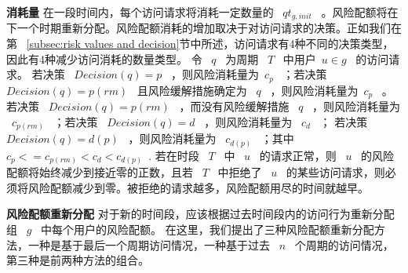 \textbf{消耗量} 在一段时间内，每个访问请求将消耗一定数量的 ~$qt_{g,init}$~ 。风险配额将在下一个时期重新分配。风险配额消耗的增加取决于对访问请求的决策。正如我们在第 ~\ref{subsec:risk values and decision}节中所述，访问请求有4种不同的决策类型，因此有4种减少访问消耗的数量类型。 令 ~$q$~ 为周期 ~$T$~ 中用户~$u \in g$~ 的访问请求。 若决策 ~$Decision(q)=p$~ ，则风险消耗量为~$c_p$~ ；若决策 ~$Decision(q)=p(rm)$~ 且风险缓解措施确定为 ~$q$~ ，则风险消耗量为~$c_p$~ 。若决策 ~$Decision(q)=p(rm)$~ ，而没有风险缓解措施 ~$q$~ ，则风险消耗量为 ~$c_{p(rm)}$~ ；若决策 ~$Decision(q)=d$~ ，则风险消耗量为 ~$c_d$~ ； 若决策 ~$Decision(q)=d(p)$~ ，则风险消耗量为 ~$c_{d(p)}$~ ；其中 ~$c_p <= c_{p(rm)} < c_d < c_{d(p)}$~. 若在时段 ~$T$~ 中 ~$u$~ 的请求正常，则 ~$u$~ 的风险配额将始终减少到接近零的正数，且若 ~$T$~ 中拒绝了 ~$u$~ 的某些访问请求，则必须将风险配额减少到零。被拒绝的请求越多，风险配额用尽的时间就越早。

\textbf{风险配额重新分配} 对于新的时间段，应该根据过去时间段内的访问行为重新分配组 ~$g$~ 中每个用户的风险配额。 在这里，我们提出了三种风险配额重新分配方法，一种是基于最后一个周期访问情况，一种基于过去 ~$n$~ 个周期的访问情况，第三种是前两种方法的组合。

